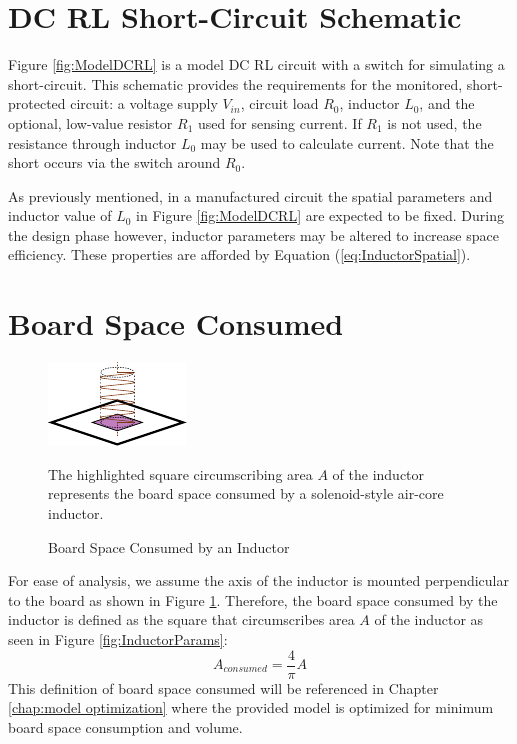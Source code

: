 \documentclass[11pt,oneside]{report}
\begin{document}
    \section{DC RL Short-Circuit Schematic}
    Figure \ref{fig:ModelDCRL} is a model DC RL circuit with a switch for simulating a short-circuit. This schematic provides the requirements for the monitored, short-protected circuit: a voltage supply $V_{in}$, circuit load $R_{0}$, inductor $L_{0}$, and the optional, low-value resistor $R_{1}$ used for sensing current. If $R_{1}$ is not used, the resistance through inductor $L_{0}$ may be used to calculate current. Note that the short occurs via the switch around $R_{0}$.
    
    As previously mentioned, in a manufactured circuit the spatial parameters and inductor value of $L_0$ in Figure \ref{fig:ModelDCRL} are expected to be fixed. During the design phase however, inductor parameters may be altered to increase space efficiency. These properties are afforded by Equation (\ref{eq:InductorSpatial}).
    
    \section{Board Space Consumed}
    \begin{figure}
    	\centering
        \includegraphics[scale=2.0]{img/Inductor_Perpendicular_Mount.pdf}
        \caption{Board Space Consumed by an Inductor} The highlighted square circumscribing area $A$ of the inductor represents the board space consumed by a solenoid-style air-core inductor.
        \label{fig:BoardSpaceConsumed}
    \end{figure}
    For ease of analysis, we assume the axis of the inductor is mounted perpendicular to the board as shown in Figure \ref{fig:BoardSpaceConsumed}. Therefore, the board space consumed by the inductor is defined as the square that circumscribes area $A$ of the inductor as seen in Figure \ref{fig:InductorParams}:
    \begin{equation}\label{eq:AreaConsumed}
    A_{consumed} = \frac{4}{\pi}A
    \end{equation}
    This definition of board space consumed will be referenced in Chapter \ref{chap:model optimization} where the provided model is optimized for minimum board space consumption and volume.
\end{document}
